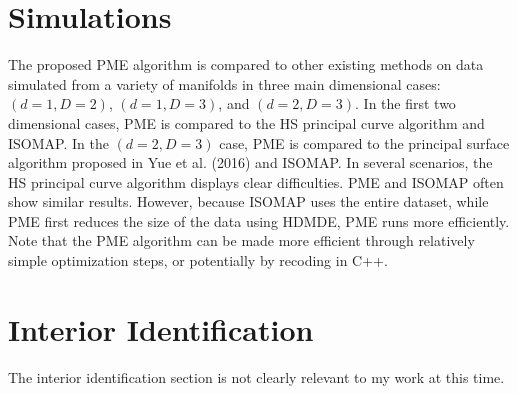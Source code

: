 \section*{Simulations}

The proposed PME algorithm is compared to other existing methods on data simulated from a variety of manifolds in three main dimensional cases: $(d = 1, D = 2)$, $(d = 1, D = 3)$, and $(d = 2, D = 3)$. In the first two dimensional cases, PME is compared to the HS principal curve algorithm and ISOMAP. In the $(d = 2, D = 3)$ case, PME is compared to the principal surface algorithm proposed in Yue et al. (2016) and ISOMAP. In several scenarios, the HS principal curve algorithm displays clear difficulties. PME and ISOMAP often show similar results. However, because ISOMAP uses the entire dataset, while PME first reduces the size of the data using HDMDE, PME runs more efficiently. Note that the PME algorithm can be made more efficient through relatively simple optimization steps, or potentially by recoding in C++.

\section*{Interior Identification}

The interior identification section is not clearly relevant to my work at this time.

